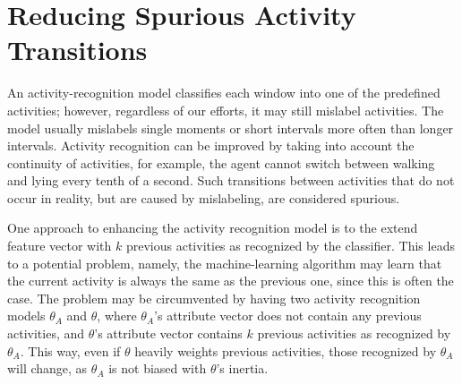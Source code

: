 
%
%
\section{Reducing Spurious Activity Transitions}
\label{sec:ar:spurious}

An activity-recognition model classifies each window into one of the predefined activities; however, regardless of our efforts, it may still mislabel activities. The model usually mislabels single moments or short intervals more often than longer intervals. Activity recognition can be improved by taking into account the continuity of activities, for example, the agent cannot switch between walking and lying every tenth of a second. Such transitions between activities that do not occur in reality, but are caused by mislabeling, are considered spurious. 

One approach to enhancing the activity recognition model is to the extend feature vector with $k$ previous activities as recognized by the classifier. This leads to a potential problem, namely, the machine-learning algorithm may learn that the current activity is always the same as the previous one, since this is often the case. The problem may be circumvented by having two activity recognition models $\theta_A$ and $\theta$, where $\theta_A$'s attribute vector does not contain any previous activities, and $\theta$'s attribute vector contains $k$ previous activities as recognized by $\theta_A$. This way, even if $\theta$ heavily weights previous activities, those  recognized by $\theta_A$ will change, as $\theta_A$ is not biased with $\theta$'s inertia.

